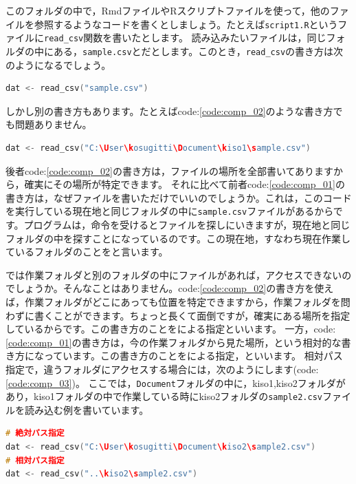 \documentclass{ltjsbook}
\begin{document}
このフォルダの中で，RmdファイルやRスクリプトファイルを使って，他のファイルを参照するようなコードを書くとしましょう。たとえば\verb|script1.R|というファイルに\verb|read_csv|関数を書いたとします。
読み込みたいファイルは，同じフォルダの中にある，\verb|sample.csv|とだとします。このとき，\verb|read_csv|の書き方は次のようになるでしょう。

\begin{lstlisting}[language=c++,label={code:comp_01},caption={相対パスで読み込む}]
dat <- read_csv("sample.csv")
\end{lstlisting}

しかし別の書き方もあります。たとえばcode:\ref{code:comp_02}のような書き方でも問題ありません。
\begin{lstlisting}[language=c++,label={code:comp_02},caption={絶対パスで読み込む}]
dat <- read_csv("C:\User\kosugitti\Document\kiso1\sample.csv")
\end{lstlisting}

後者code:\ref{code:comp_02}の書き方は，ファイルの場所を全部書いてありますから，確実にその場所が特定できます。
それに比べて前者code:\ref{code:comp_01}の書き方は，なぜファイルを書いただけでいいのでしょうか。これは，このコードを実行している現在地と同じフォルダの中に\verb|sample.csv|ファイルがあるからです。プログラムは，命令を受けるとファイルを探しにいきますが，現在地と同じフォルダの中を探すことになっているのです。この現在地，すなわち現在作業しているフォルダのことをと言います。

では作業フォルダと別のフォルダの中にファイルがあれば，アクセスできないのでしょうか。そんなことはありません。code:\ref{code:comp_02}の書き方を使えば，作業フォルダがどこにあっても位置を特定できますから，作業フォルダを問わずに書くことができます。ちょっと長くて面倒ですが，確実にある場所を指定しているからです。この書き方のことをによる指定といいます。
一方，code:\ref{code:comp_01}の書き方は，今の作業フォルダから見た場所，という相対的な書き方になっています。この書き方のことをによる指定，といいます。
相対パス指定で，違うフォルダにアクセスする場合には，次のようにします(code:\ref{code:comp_03})。
ここでは，\verb|Document|フォルダの中に，kiso1,kiso2フォルダがあり，kiso1フォルダの中で作業している時にkiso2フォルダの\verb|sample2.csv|ファイルを読み込む例を書いています。

\begin{lstlisting}[language=c++,label={code:comp_03},caption={絶対パスで読み込む}]
# 絶対パス指定
dat <- read_csv("C:\User\kosugitti\Document\kiso2\sample2.csv")
# 相対パス指定
dat <- read_csv("..\kiso2\sample2.csv")
\end{lstlisting}
\end{document}
